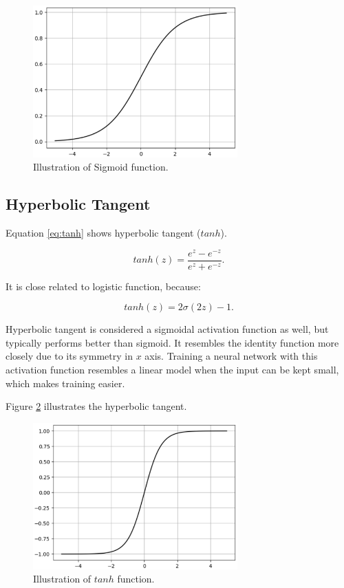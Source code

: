 \begin{figure}[!htbp]
	\centering
	\includegraphics[width=0.7\textwidth]{Cap3/sigmoid.eps}
	\caption{Illustration of Sigmoid function.}
	\label{fig:sigmoid}
\end{figure}

\subsection{Hyperbolic Tangent}

Equation \ref{eq:tanh} shows hyperbolic tangent ($tanh$).


\begin{equation}
tanh(z) = \frac{e^{z} - e^{-z}}{e^{z} + e^{-z}}.
\label{eq:tanh}
\end{equation}

It is close related to logistic function, because:

\begin{equation}
tanh(z) = 2\sigma(2z) - 1.
\label{eq:tanhsigmoid}
\end{equation}

Hyperbolic tangent is considered a sigmoidal activation function as well, but typically performs better than sigmoid. It resembles the identity function more closely due to its symmetry in $x$ axis. Training a neural network with this activation function resembles a linear model when the input can be kept small, which makes training easier.

Figure \ref{fig:tanh} illustrates the hyperbolic tangent.

\begin{figure}[!htbp]
	\centering
	\includegraphics[width=0.7\textwidth]{Cap3/tanh.eps}
	\caption{Illustration of $tanh$ function.}
	\label{fig:tanh}
\end{figure}


